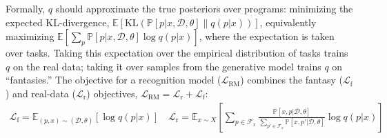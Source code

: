 \documentclass{article}
\newcommand{\system}{\textsc{EC$^2$} }
\newcommand{\expect}{\mathds{E}} %
\newcommand{\probability}{\mathds{P}} %
\begin{document}
Formally, $q$ should approximate the true posteriors over programs: minimizing the expected KL-divergence, $  \expect\left[\text{KL}\left(\probability[p|x,\mathcal{D},\theta]\|q(p|x) \right) \right]$,
 equivalently maximizing $  \expect[\sum_p\probability[p|x,\mathcal{D},\theta]\log q(p|x) ]$,
 where the expectation is taken over tasks. Taking this expectation over the empirical distribution of tasks trains $q$ on the real data; taking it over samples from the generative model trains $q$ on ``fantasies.''
 The  objective for a recognition model ($\mathcal{L}_{\text{RM}}$) combines the fantasy ($\mathcal{L}_{\text{f}}$) and real-data ($\mathcal{L}_{\text{r}}$) objectives, $\mathcal{L}_{\text{RM}} = \mathcal{L}_\text{r} + \mathcal{L}_\text{f}$:
\begin{align}\nonumber
\mathcal{L}_{\text{f}} = \expect_{(p,x)\sim(\mathcal{D},\theta) }\left[\log q(p|x)\right]\quad
\mathcal{L}_{\text{r}} = \expect_{x\sim X}\left[\sum_{p\in \mathcal{F}_x}
  \frac{\probability\left[x,p|\mathcal{D},\theta \right]}{\sum_{p'\in \mathcal{F}_x}\probability\left[x,p'|\mathcal{D},\theta \right]}\log q(p|x)\right]
\end{align}

\end{document}
